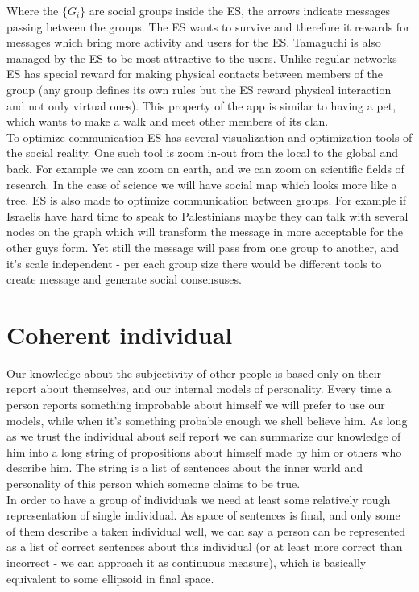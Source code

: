 \documentclass{article}
\begin{document}
Where the $\{G_{i}\}$ are social groups inside the ES, the arrows indicate messages passing between the groups. The ES wants to survive and therefore it rewards for messages which bring more activity and users for the ES. Tamaguchi is also managed by the ES to be most attractive to the users. Unlike regular networks ES has special reward for making physical contacts between members of the group (any group defines its own rules but the ES reward physical interaction and not only virtual ones). This property of the app is similar to having a pet, which wants to make a walk and meet other members of its clan.  \\

To optimize communication ES has several visualization and optimization tools of the social reality. One such tool is zoom in-out from the local to the global and back. For example we can zoom on earth, and we can zoom on scientific fields of research. In the case of science we will have social map which looks more like a tree. ES is also made to optimize communication between groups. For example if Israelis have hard time to speak to Palestinians maybe they can talk with several nodes on the graph which will transform the message in more acceptable for the other guys form. Yet still the message will pass from one group to another, and it's scale independent - per each group size there would be different tools to create message and generate social consensuses. 

\section{Coherent individual}

Our knowledge about the subjectivity of other people is based only on their report about themselves, and our internal models of personality. Every time a person reports something improbable about himself we will prefer to use our models, while when it's something probable enough we shell believe him. As long as we trust the individual about self report we can summarize our knowledge of him into a long string of propositions about himself made by him or others who describe him. The string is a list of sentences about the inner world and personality of this person which someone claims to be true. \\

In order to have a group of individuals we need at least some relatively rough representation of single individual. As space of sentences is final, and only some of them describe a taken individual well, we can say a person can be represented as a list of correct sentences about this individual (or at least more correct than incorrect - we can approach it as continuous measure), which is basically equivalent to some ellipsoid in final space. \\
\end{document}
